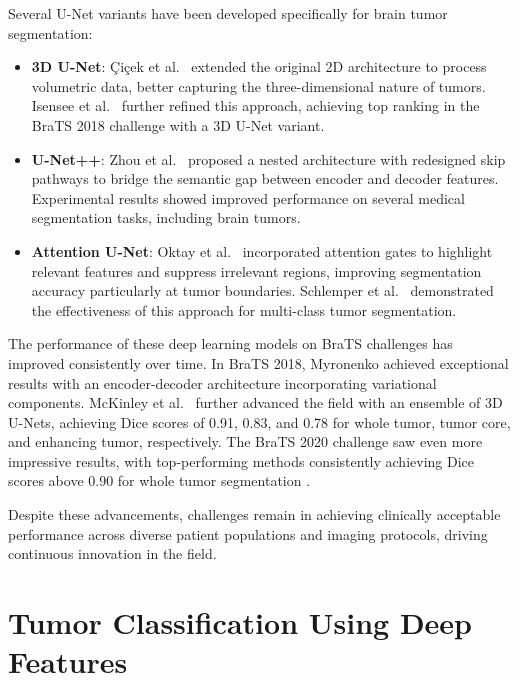 Several U-Net variants have been developed specifically for brain tumor segmentation:

\begin{itemize}
  \item \textbf{3D U-Net}: Çiçek et al.\ \cite{Cicek2016} extended the original 2D architecture to process volumetric data, better capturing the three-dimensional nature of tumors. Isensee et al.\ \cite{Isensee2018} further refined this approach, achieving top ranking in the BraTS 2018 challenge with a 3D U-Net variant.

  \item \textbf{U-Net++}: Zhou et al.\ \cite{Zhou2019} proposed a nested architecture with redesigned skip pathways to bridge the semantic gap between encoder and decoder features. Experimental results showed improved performance on several medical segmentation tasks, including brain tumors.

  \item \textbf{Attention U-Net}: Oktay et al.\ \cite{Oktay2018} incorporated attention gates to highlight relevant features and suppress irrelevant regions, improving segmentation accuracy particularly at tumor boundaries. Schlemper et al.\ \cite{Schlemper2019} demonstrated the effectiveness of this approach for multi-class tumor segmentation.
\end{itemize}

The performance of these deep learning models on BraTS challenges has improved consistently over time. In BraTS 2018, Myronenko \cite{Myronenko2018} achieved exceptional results with an encoder-decoder architecture incorporating variational components. McKinley et al.\ \cite{McKinley2019} further advanced the field with an ensemble of 3D U-Nets, achieving Dice scores of 0.91, 0.83, and 0.78 for whole tumor, tumor core, and enhancing tumor, respectively. The BraTS 2020 challenge saw even more impressive results, with top-performing methods consistently achieving Dice scores above 0.90 for whole tumor segmentation \cite{Isensee2021}.

Despite these advancements, challenges remain in achieving clinically acceptable performance across diverse patient populations and imaging protocols, driving continuous innovation in the field.

\section{Tumor Classification Using Deep Features}

